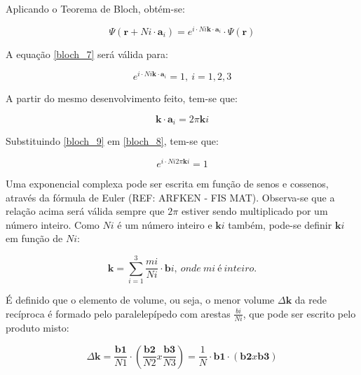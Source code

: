 	\par Aplicando o Teorema de Bloch, obtém-se:

	\begin{equation}
		\label{bloch_7}
		\Psi(\mathbf{r} + Ni \cdot \mathbf{a}_{i}) = e^{i\cdot N i \mathbf{k} \cdot \mathbf{a}_{i}} \cdot \Psi(\mathbf{r})
	\end{equation}

	\par A equação \eqref{bloch_7} será válida para:

	\begin{equation}
		\label{bloch_8}
		e^{i\cdot N i \mathbf{k} \cdot \mathbf{a}_{i}} = 1,\ i=1,2,3
	\end{equation}

	\par A partir do mesmo desenvolvimento feito, tem-se que:

	\begin{equation}
		\label{bloch_9}
		\mathbf{k} \cdot \mathbf{a}_{i} = 2 \pi \mathbf{k} i
	\end{equation}

	\par Substituindo \eqref{bloch_9} em \eqref{bloch_8}, tem-se que:

	\begin{equation}
		\label{bloch_10}
		e^{i\cdot N i 2 \pi \mathbf{k} i} = 1
	\end{equation}

	\par Uma exponencial complexa pode ser escrita em função de senos e cossenos, através da fórmula de Euler (REF: ARFKEN - FIS MAT). Observa-se que a relação acima será válida sempre que $2\pi$ estiver sendo multiplicado por um número inteiro. Como $Ni$ é um número inteiro e $\mathbf{k}i$ também, pode-se definir $\mathbf{k}i$ em função de $Ni$:

	\begin{equation}
		\label{bloch_11}
		\mathbf{k} = \sum_{i=1}^3 \frac{mi}{Ni} \cdot \mathbf{b}i,\ onde\ mi\ é\ inteiro.
	\end{equation}

	\par É definido que o elemento de volume, ou seja, o menor volume $\Delta\mathbf{k}$ da rede recíproca é formado pelo paralelepípedo com arestas $\frac{bi}{Ni}$, que pode ser escrito pelo produto misto:

	\begin{equation}
		\label{bloch_12}
		\Delta \mathbf{k} = \frac{\mathbf{b1}}{N1} \cdot \left( \frac{\mathbf{b2}}{N2} x \frac{\mathbf{b3}}{N3} \right)
			= \frac{1}{N} \cdot \mathbf{b1} \cdot \left(\mathbf{b2} x \mathbf{b3}\right)
	\end{equation}

